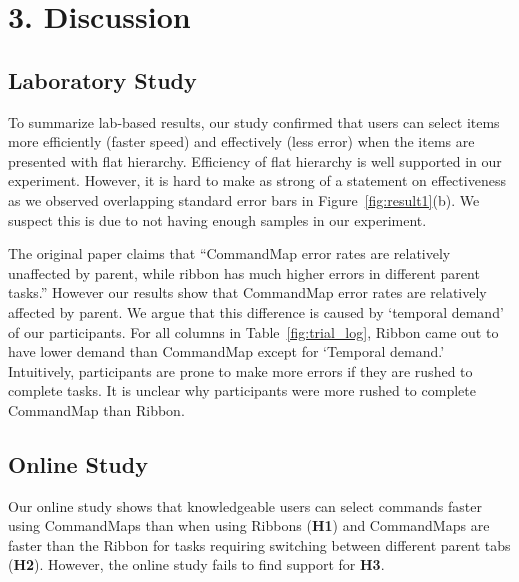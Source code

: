 \documentclass{article}
\begin{document}
\section*{3. Discussion} 
\subsection*{Laboratory Study}
To summarize lab-based results, our study confirmed that users can select items more efficiently (faster speed) and effectively (less error) when the items are presented with flat hierarchy. Efficiency of flat hierarchy is well supported in our experiment. However, it is hard to make as strong of a statement on effectiveness as we observed overlapping standard error bars in Figure~\ref{fig:result1}(b). We suspect this is due to not having enough samples in our experiment. 



The original paper claims that ``CommandMap error rates are relatively unaffected by parent, while ribbon has much higher errors in different parent tasks.'' However our results show that CommandMap error rates are relatively affected by parent. We argue that this difference is caused by `temporal demand' of our participants. For all columns in Table~\ref{fig:trial_log}, Ribbon came out to have lower demand than CommandMap except for `Temporal demand.' Intuitively, participants are prone to make more errors if they are rushed to complete tasks. It is unclear why participants were more rushed to complete CommandMap than Ribbon. 

\subsection*{Online Study}
Our online study shows that knowledgeable users can select commands faster using CommandMaps than when using Ribbons (\textbf{H1}) and CommandMaps are faster than the Ribbon for tasks requiring switching between different parent tabs (\textbf{H2}). However, the online study fails to find support for \textbf{H3}.
\end{document}
